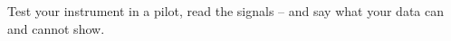 
\newcommand{\website}{https://edu-mrh.de/englisch/w-seminar-time/data-refine.html}
\newcommand{\cbx}{\lsgoder{\raisebox{-0.2ex}{\textcolor{sec}{\boldmath$\boxtimes$}}\ }{\cb}}
\newcommand{\phase}[2]{\colorbox{sectint}{\headfont\scriptsize\textcolor{sec}{#1}\,\textcolor{muted}{#2}}}
\newcommand{\buchst}[1]{\fbox{\rule{0pt}{2.2ex}\makebox[4mm]{\lsgtext{#1}}}}   %



%
{Test your instrument in a pilot, read the signals – and say what your data can and cannot show.}

